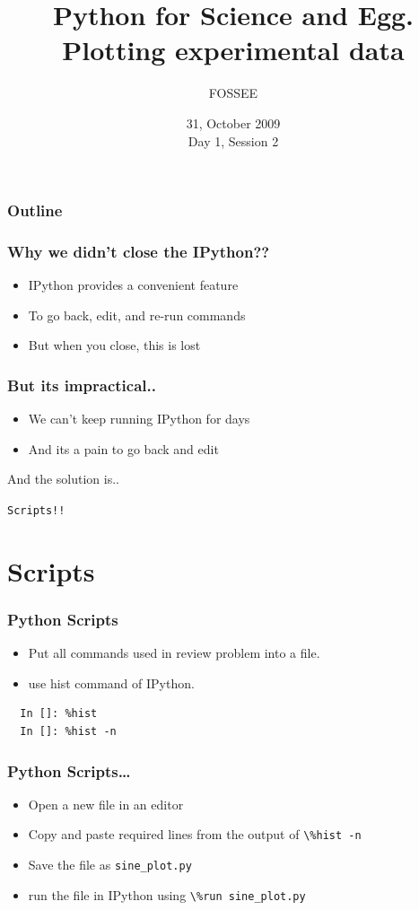 \documentclass[14pt,compress]{beamer}
\title[Plotting using Python]{Python for Science and Egg. Plotting experimental data}
\author[FOSSEE] {FOSSEE}
\institute[IIT Bombay] {Department of Aerospace Engineering\\IIT Bombay}
\date[] {31, October 2009\\Day 1, Session 2}
\newcommand{\typ}[1]{\lstinline{#1}}
\begin{document}
\begin{frame}
  \titlepage
\end{frame}

\begin{frame}
  \frametitle{Outline}
  \tableofcontents
\end{frame}

\begin{frame}
\frametitle{Why we didn't close the IPython??}
\begin{itemize}
  \item IPython provides a convenient feature
  \item To go back, edit, and re-run commands
  \item But when you close, this is lost
\end{itemize}
\end{frame}

\begin{frame}
\frametitle{But its impractical..}
\begin{itemize}
  \item We can't keep running IPython for days
  \item And its a pain to go back and edit
\end{itemize}
And the solution is..\\
\begin{center}
\alert {\typ{Scripts!!}}
\end{center}
\end{frame}

\section{Scripts}
\begin{frame}[fragile]
\frametitle{Python Scripts}
\begin{itemize}
\item Put all commands used in review problem into a file. 
\item use hist command of IPython.
\end{itemize}
\begin{lstlisting}
  In []: %hist
  In []: %hist -n
\end{lstlisting}
\end{frame}

\begin{frame}
\frametitle{Python Scripts\ldots}
  \begin{itemize}
    \item Open a new file in an \alert{editor}
    \item Copy and paste required lines from the output of \typ{\%hist -n}
    \item Save the file as \typ{sine_plot.py}
  \end{itemize}
  \begin{itemize}
  \item run the file in IPython using \typ{\%run sine_plot.py}\\
  \end{itemize}
\end{frame}
\end{document}
